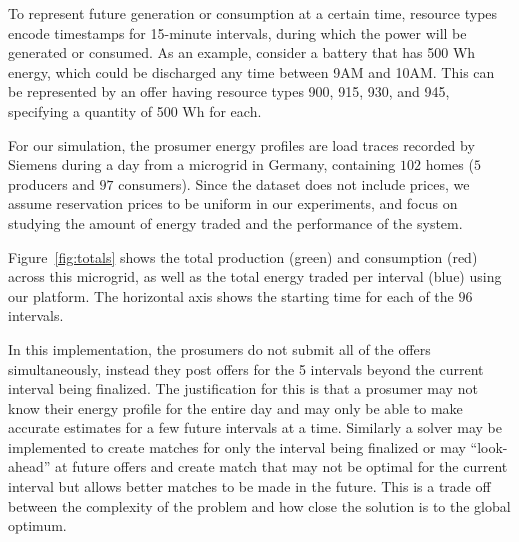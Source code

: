 To represent future generation or consumption at a certain time, %
resource types encode %
timestamps for 15-minute intervals, during which the power will be generated or consumed. 
As an example, consider a battery that has 500 Wh energy, which could be discharged any time between 9AM and 10AM.
This can be represented by an offer having resource types 900, 915, 930, and 945, specifying a quantity of 500 Wh for each.

 
 For our simulation, the prosumer energy profiles are load traces recorded by Siemens during a day from a microgrid in Germany, containing $102$ homes %
 ($5$ producers and $97$ consumers). Since the dataset does not include prices, we assume reservation prices to be uniform in our experiments, and focus on studying the amount of energy traded and the performance of the system. %


Figure~\ref{fig:totals} shows the total production (green) and consumption (red) across this microgrid, as well as the total energy traded per interval (blue) using our platform. The horizontal axis shows the starting time for each of the $96$ intervals.


\ifExtended
In this implementation, the prosumers do not submit all of the offers simultaneously, instead they post offers for the 5 intervals beyond the current interval being finalized. The justification for this is that a prosumer may not know their energy profile for the entire day and may only be able to make accurate estimates for a few future intervals at a time. Similarly a solver may be implemented to create matches for only the interval being finalized or may ``look-ahead'' at future offers and create match that may not be optimal for the current interval but allows better matches to be made in the future. This is a trade off between the complexity of the problem and how close the solution is to the global optimum.
\fi

